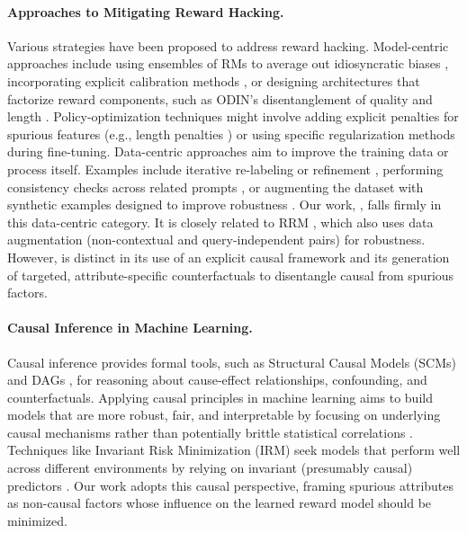 \paragraph{Approaches to Mitigating Reward Hacking.}
Various strategies have been proposed to address reward hacking. Model-centric approaches include using ensembles of RMs to average out idiosyncratic biases \citep{coste2023reward, eisenstein2023helping, rame2024warm}, incorporating explicit calibration methods \citep{zhao2023slic}, or designing architectures that factorize reward components, such as ODIN's disentanglement of quality and length \citep{chen2024odin}. Policy-optimization techniques might involve adding explicit penalties for spurious features (e.g., length penalties \citep{park2024disentangling}) or using specific regularization methods during fine-tuning. Data-centric approaches aim to improve the training data or process itself. Examples include iterative re-labeling or refinement \citep{bai2022constitutional}, performing consistency checks across related prompts \citep{shen2023trickle}, or augmenting the dataset with synthetic examples designed to improve robustness \citep{pace2024west, shen2024boosting}. Our work, \carma{}, falls firmly in this data-centric category. It is closely related to RRM \citep{liu2024rrm}, which also uses data augmentation (non-contextual and query-independent pairs) for robustness. However, \carma{} is distinct in its use of an explicit causal framework and its generation of targeted, attribute-specific counterfactuals to disentangle causal from spurious factors.

\paragraph{Causal Inference in Machine Learning.}
Causal inference provides formal tools, such as Structural Causal Models (SCMs) and DAGs \citep{pearl2009causality, peters2017elements}, for reasoning about cause-effect relationships, confounding, and counterfactuals. Applying causal principles in machine learning aims to build models that are more robust, fair, and interpretable by focusing on underlying causal mechanisms rather than potentially brittle statistical correlations \citep{scholkopf2021toward}. Techniques like Invariant Risk Minimization (IRM) seek models that perform well across different environments by relying on invariant (presumably causal) predictors \citep{arjovsky2019invariant}. Our work adopts this causal perspective, framing spurious attributes as non-causal factors whose influence on the learned reward model should be minimized.

